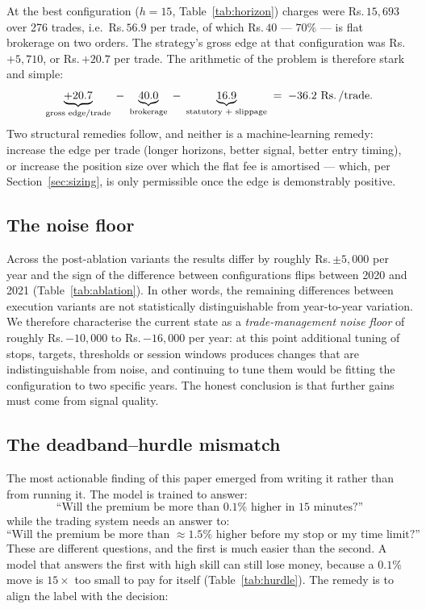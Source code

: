 \documentclass[11pt,a4paper]{article}
\newcommand{\rs}{Rs.\,}                 %
\begin{document}
At the best configuration ($h=15$, Table~\ref{tab:horizon}) charges were \rs$15{,}693$
over 276 trades, i.e.\ \rs$56.9$ per trade, of which \rs$40$ --- $70\%$ --- is flat
brokerage on two orders. The strategy's gross edge at that configuration was
\rs$+5{,}710$, or \rs$+20.7$ per trade. The arithmetic of the problem is therefore
stark and simple:
\begin{equation}
\underbrace{+20.7}_{\text{gross edge/trade}} \;-\;
\underbrace{40.0}_{\text{brokerage}} \;-\;
\underbrace{16.9}_{\text{statutory + slippage}} \;=\; -36.2\ \text{\rs/trade}.
\end{equation}
Two structural remedies follow, and neither is a machine-learning remedy: increase the
edge per trade (longer horizons, better signal, better entry timing), or increase the
position size over which the flat fee is amortised --- which, per Section~\ref{sec:sizing},
is only permissible once the edge is demonstrably positive.

\subsection{The noise floor}\label{sec:floor}

Across the post-ablation variants the results differ by roughly \rs$\pm 5{,}000$ per year
and the sign of the difference between configurations flips between 2020 and 2021
(Table~\ref{tab:ablation}). In other words, the remaining differences between execution
variants are not statistically distinguishable from year-to-year variation. We therefore
characterise the current state as a \emph{trade-management noise floor} of roughly
\rs$-10{,}000$ to \rs$-16{,}000$ per year: at this point additional tuning of stops,
targets, thresholds or session windows produces changes that are indistinguishable from
noise, and continuing to tune them would be fitting the configuration to two specific
years. The honest conclusion is that further gains must come from signal quality.

\subsection{The deadband--hurdle mismatch}\label{sec:hurdle-mismatch}

The most actionable finding of this paper emerged from writing it rather than from
running it. The model is trained to answer:
\[
\text{``Will the premium be more than } 0.1\% \text{ higher in 15 minutes?''}
\]
while the trading system needs an answer to:
\[
\text{``Will the premium be more than } \approx\!1.5\% \text{ higher before my stop or my
time limit?''}
\]
These are different questions, and the first is much easier than the second. A model that
answers the first with high skill can still lose money, because a $0.1\%$ move is
$15\times$ too small to pay for itself (Table~\ref{tab:hurdle}). The remedy is to align
the label with the decision:
\end{document}
